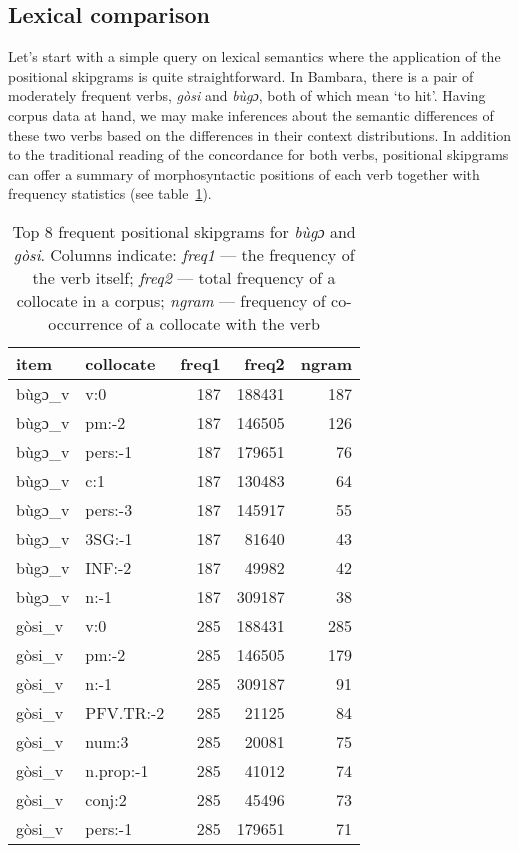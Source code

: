 \documentclass[12pt]{article}
\begin{document}
\subsection{Lexical comparison}

Let's start with a simple query on lexical semantics where the
application of the positional skipgrams is quite straightforward.  In
Bambara, there is a pair of moderately frequent verbs, \textit{gòsi}
and \textit{bùgɔ}, both of which mean ‘to hit’. Having corpus data at
hand, we may make inferences about the semantic differences of these
two verbs based on the differences in their context distributions.  In
addition to the traditional reading of the concordance for both verbs,
positional skipgrams can offer a summary of morphosyntactic positions of
each verb together with frequency statistics (see table~\ref{tab:bugogosi.freq}). 

\begin{table}[ht]
  \small
  \centering
  \begin{tabular}{llrrr}
    \toprule
    item & collocate & freq1 & freq2 & ngram\\
    \midrule
    bùgɔ\_v & v:0 & 187 & 188431 & 187\\
    bùgɔ\_v & pm:-2 & 187 & 146505 & 126\\
    bùgɔ\_v & pers:-1 & 187 & 179651 & 76\\
    bùgɔ\_v & c:1 & 187 & 130483 & 64\\
    bùgɔ\_v & pers:-3 & 187 & 145917 & 55\\
    bùgɔ\_v & 3SG:-1 & 187 & 81640 & 43\\
    bùgɔ\_v & INF:-2 & 187 & 49982 & 42\\
    bùgɔ\_v & n:-1 & 187 & 309187 & 38\\
    \addlinespace
    gòsi\_v & v:0 & 285 & 188431 & 285\\
    gòsi\_v & pm:-2 & 285 & 146505 & 179\\
    gòsi\_v & n:-1 & 285 & 309187 & 91\\
    gòsi\_v & PFV.TR:-2 & 285 & 21125 & 84\\
    gòsi\_v & num:3 & 285 & 20081 & 75\\
    gòsi\_v & n.prop:-1 & 285 & 41012 & 74\\
    gòsi\_v & conj:2 & 285 & 45496 & 73\\
    gòsi\_v & pers:-1 & 285 & 179651 & 71\\
    \bottomrule
  \end{tabular}
  
  \caption{Top 8 frequent positional skipgrams for \textit{bùgɔ} and
    \textit{gòsi}. Columns indicate: \textit{freq1} — the frequency of
    the verb itself; \textit{freq2} — total frequency of a collocate
    in a corpus; \textit{ngram} — frequency of co-occurrence of a
    collocate with the verb}
  \label{tab:bugogosi.freq}
\end{table}
\end{document}
